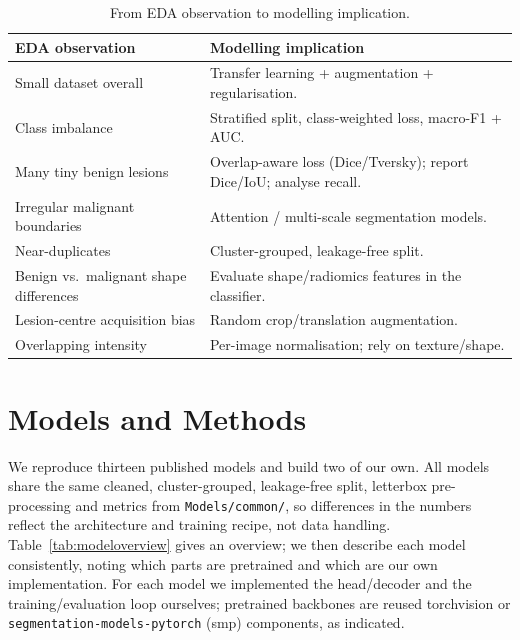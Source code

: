\documentclass[11pt]{article}
\begin{document}
\begin{table}[H]
\centering
\caption{From EDA observation to modelling implication.}
\label{tab:implications}
\small
\begin{tabularx}{\linewidth}{@{}L{5.2cm} Y@{}}
\toprule
EDA observation & Modelling implication \\
\midrule
Small dataset overall                    & Transfer learning + augmentation + regularisation. \\
Class imbalance                          & Stratified split, class-weighted loss, macro-F1 + AUC. \\
Many tiny benign lesions                 & Overlap-aware loss (Dice/Tversky); report Dice/IoU; analyse recall. \\
Irregular malignant boundaries           & Attention / multi-scale segmentation models. \\
Near-duplicates                          & Cluster-grouped, leakage-free split. \\
Benign vs.\ malignant shape differences  & Evaluate shape/radiomics features in the classifier. \\
Lesion-centre acquisition bias           & Random crop/translation augmentation. \\
Overlapping intensity                    & Per-image normalisation; rely on texture/shape. \\
\bottomrule
\end{tabularx}
\end{table}

\section{Models and Methods}
\label{sec:models}
We reproduce thirteen published models and build two of our own. All models share
the same cleaned, cluster-grouped, leakage-free split, letterbox pre-processing
and metrics from \texttt{Models/common/}, so differences in the numbers reflect
the architecture and training recipe, not data handling. Table~\ref{tab:modeloverview}
gives an overview; we then describe each model consistently, noting which parts
are pretrained and which are our own implementation. For each model we
implemented the head/decoder and the training/evaluation loop ourselves;
pretrained backbones are reused torchvision or \texttt{segmentation-models-pytorch}
(smp) components, as indicated.
\end{document}
